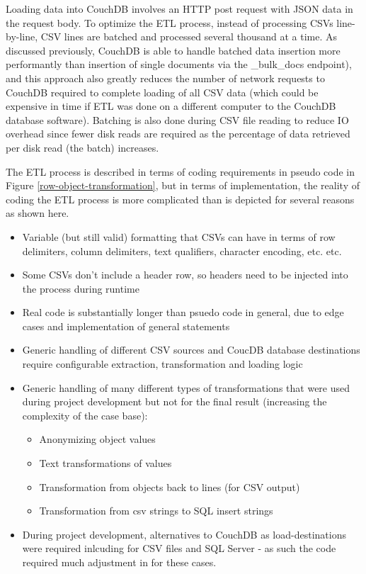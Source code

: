 Loading data into CouchDB involves an HTTP post request with JSON data in the request body. To optimize the ETL process, instead of processing CSVs line-by-line, CSV lines are batched and processed several thousand at a time. As discussed previously, CouchDB is able to handle batched data insertion more performantly than insertion of single documents via the \_bulk\_docs endpoint), and this approach also greatly reduces the number of network requests to CouchDB required to complete loading of all CSV data (which could be expensive in time if ETL was done on a different computer to the CouchDB database software). Batching is also done during CSV file reading to reduce IO overhead since fewer disk reads are required as the percentage of data retrieved per disk read (the batch) increases.

The ETL process is described in terms of coding requirements in pseudo code in Figure \ref{row-object-transformation}, but in terms of implementation, the reality of coding the ETL process is more complicated than is depicted for several reasons as shown here.

\begin{itemize}
  \item Variable (but still valid) formatting that CSVs can have in terms of row delimiters, column delimiters, text qualifiers, character encoding, etc. etc.
  \item Some CSVs don't include a header row, so headers need to be injected into the process during runtime
  \item Real code is substantially longer than psuedo code in general, due to edge cases and implementation of general statements
  \item Generic handling of different CSV sources and CoucDB database destinations require configurable extraction, transformation and loading logic
  \item Generic handling of many different types of transformations that were used during project development but not for the final result (increasing the complexity of the case base):
        \begin{itemize}
          \item Anonymizing object values
          \item Text transformations of values
          \item Transformation from objects back to lines (for CSV output)
          \item Transformation from csv strings to SQL insert strings
        \end{itemize}
  \item During project development, alternatives to CouchDB as load-destinations were required inlcuding for CSV files and SQL Server - as such the code required much adjustment in for these cases.
\end{itemize}


